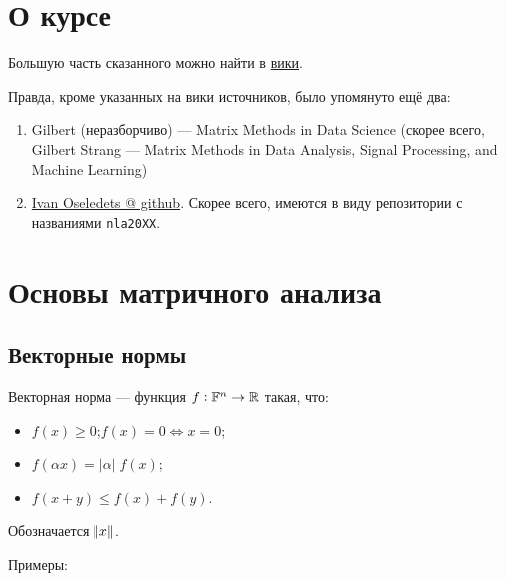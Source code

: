 \section{О курсе}

Большую часть сказанного можно найти в
\href{http://wiki.cs.hse.ru/Матричные_Вычисления_20/21}{вики}.

Правда, кроме указанных на вики источников, было упомянуто ещё два:

\begin{enumerate}
    \item Gilbert (неразборчиво) --- Matrix Methods in Data Science (скорее
        всего, Gilbert Strang --- Matrix Methods in Data Analysis, Signal
        Processing, and Machine Learning)
    \item \href{https://github.com/oseledets}{Ivan Oseledets @ github}. Скорее
        всего, имеются в виду репозитории с названиями \verb|nla20XX|.
\end{enumerate}

\section{Основы матричного анализа}

\subsection{Векторные нормы}

\begin{definition}
    Векторная норма --- функция $f: \mathbb{F}^n \to \mathbb{R}$ такая, что:
    \begin{itemize}
        \item $f(x) \ge 0$;\quad $f(x) = 0 \Leftrightarrow x = 0$;
        \item $f(\alpha x) = |\alpha|\; f(x)$;
        \item $f(x + y) \le f(x) + f(y)$.
    \end{itemize}
\end{definition}

Обозначается $\norm{x}$.

Примеры:

